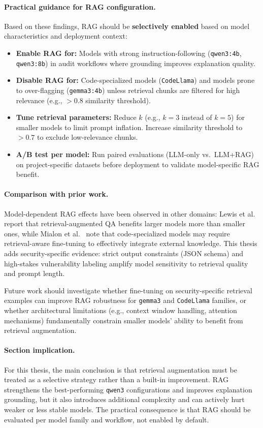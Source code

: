 \paragraph{Practical guidance for RAG configuration.}
Based on these findings, RAG should be \textbf{selectively enabled} based on model characteristics and deployment context:

\begin{itemize}
  \item \textbf{Enable RAG for:} Models with strong instruction-following (\texttt{qwen3:4b}, \texttt{qwen3:8b}) in audit workflows where grounding improves explanation quality.
  \item \textbf{Disable RAG for:} Code-specialized models (\texttt{CodeLlama}) and models prone to over-flagging (\texttt{gemma3:4b}) unless retrieval chunks are filtered for high relevance (e.g., $>0.8$ similarity threshold).
  \item \textbf{Tune retrieval parameters:} Reduce $k$ (e.g., $k=3$ instead of $k=5$) for smaller models to limit prompt inflation. Increase similarity threshold to $>0.7$ to exclude low-relevance chunks.
  \item \textbf{A/B test per model:} Run paired evaluations (LLM-only vs.\ LLM+RAG) on project-specific datasets before deployment to validate model-specific RAG benefit.
\end{itemize}

\paragraph{Comparison with prior work.}
Model-dependent RAG effects have been observed in other domains: Lewis et al.\ \cite{lewis2020rag} report that retrieval-augmented QA benefits larger models more than smaller ones, while Mialon et al.\ \cite{mialon2023augmented} note that code-specialized models may require retrieval-aware fine-tuning to effectively integrate external knowledge. This thesis adds security-specific evidence: strict output constraints (JSON schema) and high-stakes vulnerability labeling amplify model sensitivity to retrieval quality and prompt length.

Future work should investigate whether fine-tuning on security-specific retrieval examples can improve RAG robustness for \texttt{gemma3} and \texttt{CodeLlama} families, or whether architectural limitations (e.g., context window handling, attention mechanisms) fundamentally constrain smaller models' ability to benefit from retrieval augmentation.

\paragraph{Section implication.}
For this thesis, the main conclusion is that retrieval augmentation must be treated as a selective strategy rather than a built-in improvement. RAG strengthens the best-performing \texttt{qwen3} configurations and improves explanation grounding, but it also introduces additional complexity and can actively hurt weaker or less stable models. The practical consequence is that RAG should be evaluated per model family and workflow, not enabled by default.
